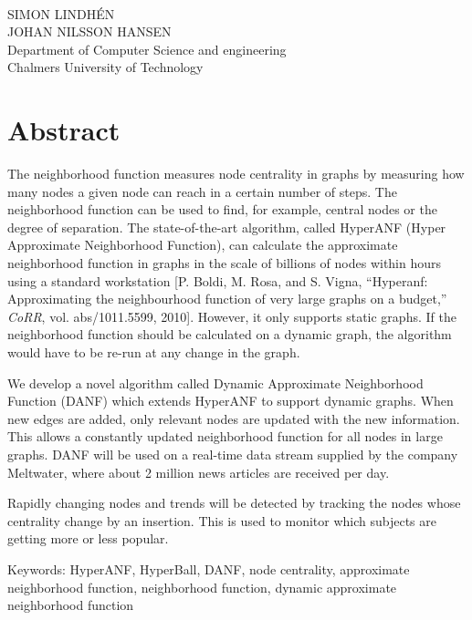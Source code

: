 \maintitle\\
\subtitle\\
SIMON LINDHÉN\\
JOHAN NILSSON HANSEN\\
Department of Computer Science and engineering\\
Chalmers University of Technology \setlength{\parskip}{0.5cm}

\thispagestyle{plain}			%
\setlength{\parskip}{0pt plus 1.0pt}
\setlength{\parindent}{15pt}
\section*{Abstract}
The neighborhood function measures node centrality in graphs by measuring how many nodes a given node can reach in a certain number of steps. The neighborhood function can be used to find, for example, central nodes or the degree of separation. The state-of-the-art algorithm, called HyperANF (Hyper Approximate Neighborhood Function), can calculate the approximate neighborhood function in graphs in the scale of billions of nodes within hours using a standard workstation [P. Boldi, M. Rosa, and S. Vigna, “Hyperanf:  Approximating the neighbourhood function of very large graphs on a budget,” \textit{CoRR}, vol. abs/1011.5599, 2010]. However, it only supports static graphs. If the neighborhood function should be calculated on a dynamic graph, the algorithm would have to be re-run at any change in the graph. 

We develop a novel algorithm called Dynamic Approximate Neighborhood Function (DANF) which extends HyperANF to support dynamic graphs. When new edges are added, only relevant nodes are updated with the new information. This allows a constantly updated neighborhood function for all nodes in large graphs. DANF will be used on a real-time data stream supplied by the company Meltwater, where about 2 million news articles are received per day.

Rapidly changing nodes and trends will be detected by tracking the nodes whose centrality change by an insertion. This is used to monitor which subjects are getting more or less popular. 

\vfill
\noindent Keywords: HyperANF, HyperBall, DANF, node centrality, approximate neighborhood function, neighborhood function, dynamic approximate neighborhood function

\newpage				%
\thispagestyle{empty}
\mbox{}